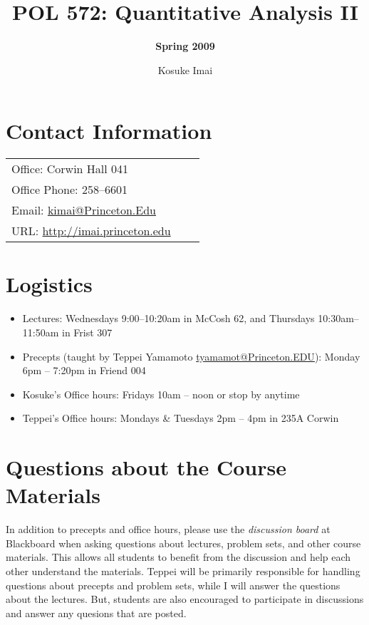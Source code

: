 \documentclass[11pt]{article}
\title{\bf POL 572: Quantitative Analysis II}
\author{\Large {\bf Spring 2009}}
\date{Kosuke Imai}
\begin{document}
\maketitle

\section{Contact Information}

\begin{flushleft}
\begin{tabular}{lcl}
Office: Corwin Hall 041 \\
Office Phone: 258--6601 \\
Email: \href{mailto:kimai@Princeton.Edu}{kimai@Princeton.Edu} \\
URL: \href{http://imai.princeton.edu}{http://imai.princeton.edu}\\
\end{tabular}
\end{flushleft}

\section{Logistics}

\begin{itemize}
\item Lectures: Wednesdays 9:00--10:20am in McCosh 62, and Thursdays
  10:30am--11:50am in Frist 307

\item Precepts (taught by Teppei Yamamoto
  \href{mailto:tyamamot@Princeton.EDU}{tyamamot@Princeton.EDU}):
  Monday 6pm -- 7:20pm in Friend 004

\item Kosuke's Office hours: Fridays 10am -- noon or stop by anytime 

\item Teppei's Office hours: Mondays \& Tuesdays 2pm -- 4pm in 235A Corwin
\end{itemize}

\section{Questions about the Course Materials}

In addition to precepts and office hours, please use the {\it
  discussion board} at Blackboard when asking questions about
lectures, problem sets, and other course materials.  This allows all
students to benefit from the discussion and help each other understand
the materials.  Teppei will be primarily responsible for handling
questions about precepts and problem sets, while I will answer the
questions about the lectures.  But, students are also encouraged to
participate in discussions and answer any quesions that are posted.
\end{document}
